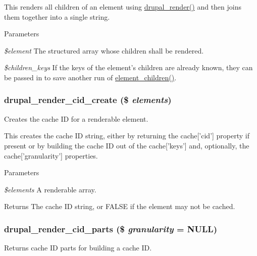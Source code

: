 This renders all children of an element using \hyperlink{common_8inc_a05798b44e8d6c496d4bee5cc32fa7851}{drupal\_\-render()} and then joins them together into a single string.


\begin{DoxyParams}{Parameters}
\item[{\em \$element}]The structured array whose children shall be rendered. \item[{\em \$children\_\-keys}]If the keys of the element's children are already known, they can be passed in to save another run of \hyperlink{common_8inc_ad38ed83e102f4f8c6c47e416543969bc}{element\_\-children()}. \end{DoxyParams}
\hypertarget{common_8inc_a28d419376079fb2c1f790d4af72451ec}{
\subsubsection[{drupal\_\-render\_\-cid\_\-create}]{\setlength{\rightskip}{0pt plus 5cm}drupal\_\-render\_\-cid\_\-create (\$ {\em elements})}}
\label{common_8inc_a28d419376079fb2c1f790d4af72451ec}
Creates the cache ID for a renderable element.

This creates the cache ID string, either by returning the cache\mbox{[}'cid'\mbox{]} property if present or by building the cache ID out of the cache\mbox{[}'keys'\mbox{]} and, optionally, the cache\mbox{[}'granularity'\mbox{]} properties.


\begin{DoxyParams}{Parameters}
\item[{\em \$elements}]A renderable array.\end{DoxyParams}
\begin{DoxyReturn}{Returns}
The cache ID string, or FALSE if the element may not be cached. 
\end{DoxyReturn}
\hypertarget{common_8inc_ae2cdc2f17d6e9fe1bbc162b40e94bd5d}{
\subsubsection[{drupal\_\-render\_\-cid\_\-parts}]{\setlength{\rightskip}{0pt plus 5cm}drupal\_\-render\_\-cid\_\-parts (\$ {\em granularity} = {\ttfamily NULL})}}
\label{common_8inc_ae2cdc2f17d6e9fe1bbc162b40e94bd5d}
Returns cache ID parts for building a cache ID.


